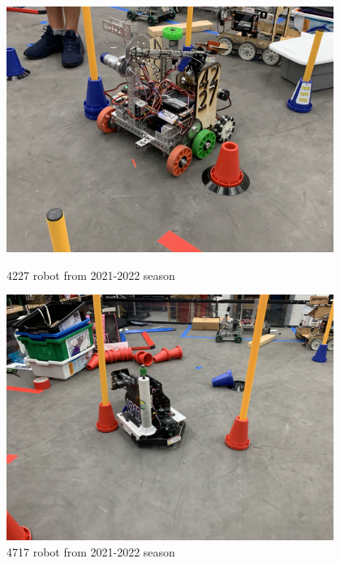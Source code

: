 \begin{figure}[ht]
\centering
\begin{minipage}[b]{.48\textwidth}
  \centering
  \includegraphics[width=0.95\textwidth]{Meetings/September/09-22-22-2/9-22-22_Hardware_Figure1.JPG}
  \caption{4227 robot from 2021-2022 season}
  \label{fig:pic1}
\end{minipage}%
\hfill%
\begin{minipage}[b]{.48\textwidth}
  \centering
  \includegraphics[width=0.95\textwidth]{Meetings/September/09-22-22-2/9-22-22_Hardware_Figure2.JPG}
  \caption{4717 robot from 2021-2022 season}
  \label{fig:pic2}
\end{minipage}
\end{figure}

